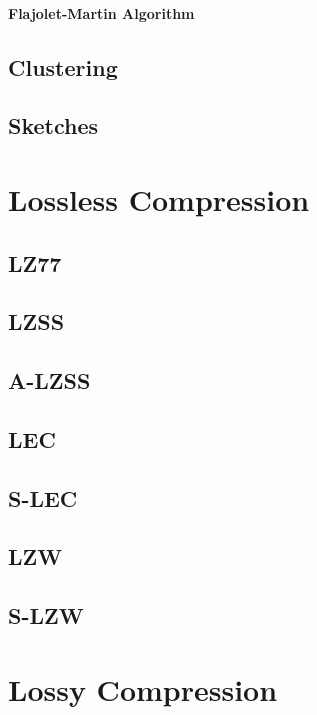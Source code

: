 \paragraph{Flajolet-Martin Algorithm}


\subsection{Clustering}

\subsection{Sketches}

\section{Lossless Compression}
\subsection{LZ77}
\subsection{LZSS}
\subsection{A-LZSS}

\subsection{LEC}
\subsection{S-LEC}

\subsection{LZW}
\subsection{S-LZW}



\section{Lossy Compression}
